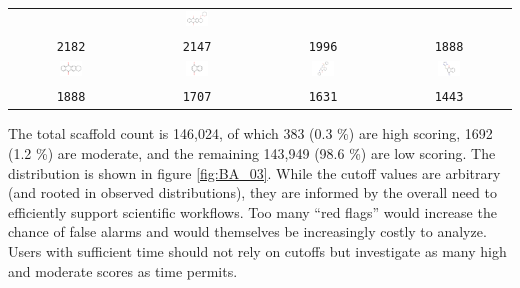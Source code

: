 \begin{table}
\begin{center}
\begin{tabular}{ |c|c|c|c| }
& \includegraphics[align=t,width=0.2\textwidth]{data/badapple/Fig2_scaf_08.png}\\
\texttt{2182} & \texttt{2147} & \texttt{1996} & \texttt{1888}\\
\hline
\includegraphics[align=t,width=0.2\textwidth]{data/badapple/Fig2_scaf_09.png} 
& \includegraphics[align=t,width=0.2\textwidth]{data/badapple/Fig2_scaf_10.png}
& \includegraphics[align=t,width=0.2\textwidth]{data/badapple/Fig2_scaf_11.png}
& \includegraphics[align=t,width=0.2\textwidth]{data/badapple/Fig2_scaf_12.png}\\
\texttt{1888} & \texttt{1707} & \texttt{1631} & \texttt{1443}\\
\hline
\end{tabular}
\end{center}
\label{table:BA_Fig2}
\end{table}

The total scaffold count is 146,024, of which 383 (0.3 \%) are high scoring, 1692 (1.2 \%) are moderate, and the remaining 143,949 (98.6 \%) are low scoring. The distribution is shown in figure \ref{fig:BA_03}. While the cutoff values are arbitrary (and rooted in observed distributions), they are informed by the overall need to efficiently support scientific workflows. Too many “red flags” would increase the chance of false alarms and would themselves be increasingly costly to analyze. Users with sufficient time should not rely on cutoffs but investigate as many high and moderate scores as time permits.

